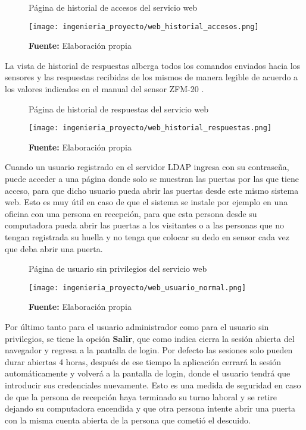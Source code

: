 \documentclass[../principal]{subfiles}
\begin{document}
  \begin{figure}[H]
    \centering
    \caption{Página de historial de accesos del servicio web}
    \texttt{[image: ingenieria\_proyecto/web\_historial\_accesos.png]}
    \caption*{\textbf{Fuente:} Elaboración propia}
    \label{fig:web_historial_accesos}
  \end{figure}

  La vista de historial de respuestas alberga todos los comandos enviados hacia los sensores y las respuestas recibidas de los mismos de manera legible de acuerdo a los valores indicados en el manual del sensor ZFM-20 \cite{manual:fingerprint_ZFM-20}.

  \begin{figure}[H]
    \centering
    \caption{Página de historial de respuestas del servicio web}
    \texttt{[image: ingenieria\_proyecto/web\_historial\_respuestas.png]}
    \caption*{\textbf{Fuente:} Elaboración propia}
    \label{fig:web_historial_respuestas}
  \end{figure}

  Cuando un usuario registrado en el servidor LDAP ingresa con su contraseña, puede acceder a una página donde solo se muestran las puertas por las que tiene acceso, para que dicho usuario pueda abrir las puertas desde este mismo sistema web. Esto es muy útil en caso de que el sistema se instale por ejemplo en una oficina con una persona en recepción, para que esta persona desde su computadora pueda abrir las puertas a los visitantes o a las personas que no tengan registrada su huella y no tenga que colocar su dedo en sensor cada vez que deba abrir una puerta.

  \begin{figure}[H]
    \centering
    \caption{Página de usuario sin privilegios del servicio web}
    \texttt{[image: ingenieria\_proyecto/web\_usuario\_normal.png]}
    \caption*{\textbf{Fuente:} Elaboración propia}
    \label{fig:web_usuario_normal}
  \end{figure}

  Por último tanto para el usuario administrador como para el usuario sin privilegios, se tiene la opción \textbf{Salir}, que como indica cierra la sesión abierta del navegador y regresa a la pantalla de login. Por defecto las sesiones solo pueden durar abiertas 4 horas, después de ese tiempo la aplicación cerrará la sesión automáticamente y volverá a la pantalla de login, donde el usuario tendrá que introducir sus credenciales nuevamente. Esto es una medida de seguridad en caso de que la persona de recepción haya terminado su turno laboral y se retire dejando su computadora encendida y que otra persona intente abrir una puerta con la misma cuenta abierta de la persona que cometió el descuido.

  \bibliografia
\end{document}
